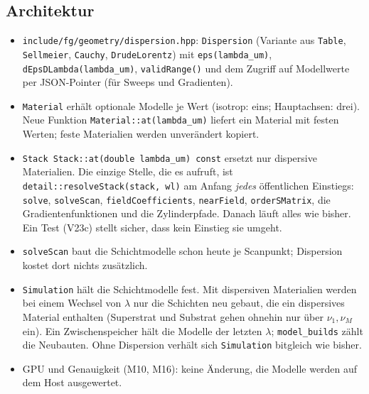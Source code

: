\subsection{Architektur}\label{sec:disp_arch}
\begin{itemize}[nosep]
  \item \verb|include/fg/geometry/dispersion.hpp|: \verb|Dispersion| (Variante aus \verb|Table|, \verb|Sellmeier|,
        \verb|Cauchy|, \verb|DrudeLorentz|) mit \verb|eps(lambda_um)|, \verb|dEpsDLambda(lambda_um)|,
        \verb|validRange()| und dem Zugriff auf Modellwerte per JSON-Pointer (für Sweeps und Gradienten).
  \item \verb|Material| erhält optionale Modelle je Wert (isotrop: eins; Hauptachsen: drei). Neue Funktion
        \verb|Material::at(lambda_um)| liefert ein Material mit festen Werten; feste Materialien werden unverändert
        kopiert.
  \item \verb|Stack Stack::at(double lambda_um) const| ersetzt nur dispersive Materialien. Die einzige Stelle, die es
        aufruft, ist \verb|detail::resolveStack(stack, wl)| am Anfang \emph{jedes} öffentlichen Einstiegs:
        \verb|solve|, \verb|solveScan|, \verb|fieldCoefficients|, \verb|nearField|, \verb|orderSMatrix|, die
        Gradientenfunktionen und die Zylinderpfade. Danach läuft alles wie bisher. Ein Test (V23c) stellt sicher, dass
        kein Einstieg sie umgeht.
  \item \verb|solveScan| baut die Schichtmodelle schon heute je Scanpunkt; Dispersion kostet dort nichts zusätzlich.
  \item \verb|Simulation| hält die Schichtmodelle fest. Mit dispersiven Materialien werden bei einem Wechsel von
        $\lambda$ nur die Schichten neu gebaut, die ein dispersives Material enthalten (Superstrat und Substrat gehen
        ohnehin nur über $\nu_1,\nu_M$ ein). Ein Zwischenspeicher hält die Modelle der letzten $\lambda$;
        \verb|model_builds| zählt die Neubauten. Ohne Dispersion verhält sich \verb|Simulation| bitgleich wie bisher.
  \item GPU und Genauigkeit (M10, M16): keine Änderung, die Modelle werden auf dem Host ausgewertet.
\end{itemize}

